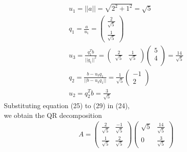 \documentclass{article}
\begin{document}
\begin{gather}
    u_1 = ||a|| = \sqrt{2^{2}+ 1^{2}} = \sqrt{5}\\
    q_1 = \frac{a}{u_1} = \begin{pmatrix} \frac{2}{\sqrt{5}} \\ \frac{1}{\sqrt{5}}\end{pmatrix} \\
    u_3 = \frac{q_1^{T}b}{||q_1||^{2}} = \begin{pmatrix}
     \frac{2}{\sqrt{5}} & \frac{1}{\sqrt{5}}
    \end{pmatrix}\begin{pmatrix}
    5 \\ 4 \\
    \end{pmatrix}= \frac{14}{\sqrt{5}}\\
    q_2 = \frac{b-u_3q_1}{||b-u_3q_1||} =\frac{1}{\sqrt{5}} \begin{pmatrix}
    -1 \\ 2
    \end{pmatrix}\\
    u_2 = q_2^{T}b = \frac{3}{\sqrt{5}}
\end{gather}
Substituting equation (25) to (29) in
(24),\\
we obtain the QR decomposition \\
\begin{align}
A = 
    \begin{pmatrix}
    \frac{2}{\sqrt{5}} & \frac{-1}{\sqrt{5}} \\ \frac{1}{\sqrt{5}} & \frac{2}{\sqrt{5}}
    \end{pmatrix}\begin{pmatrix}
    \sqrt{5} & \frac{14}{\sqrt{5}} \\ 0 &  \frac{3}{\sqrt{5}}
    \end{pmatrix}
\end{align}
\end{document}
